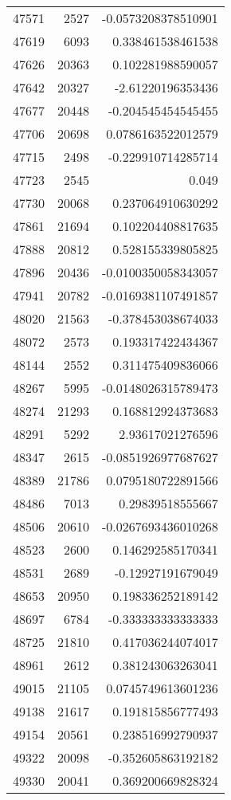 \begin{tabular}{r | r | r}
47571 & 2527 & -0.0573208378510901 \\
47619 & 6093 & 0.338461538461538 \\
47626 & 20363 & 0.102281988590057 \\
47642 & 20327 & -2.61220196353436 \\
47677 & 20448 & -0.204545454545455 \\
47706 & 20698 & 0.0786163522012579 \\
47715 & 2498 & -0.229910714285714 \\
47723 & 2545 & 0.049 \\
47730 & 20068 & 0.237064910630292 \\
47861 & 21694 & 0.102204408817635 \\
47888 & 20812 & 0.528155339805825 \\
47896 & 20436 & -0.0100350058343057 \\
47941 & 20782 & -0.0169381107491857 \\
48020 & 21563 & -0.378453038674033 \\
48072 & 2573 & 0.193317422434367 \\
48144 & 2552 & 0.311475409836066 \\
48267 & 5995 & -0.0148026315789473 \\
48274 & 21293 & 0.168812924373683 \\
48291 & 5292 & 2.93617021276596 \\
48347 & 2615 & -0.0851926977687627 \\
48389 & 21786 & 0.0795180722891566 \\
48486 & 7013 & 0.29839518555667 \\
48506 & 20610 & -0.0267693436010268 \\
48523 & 2600 & 0.146292585170341 \\
48531 & 2689 & -0.12927191679049 \\
48653 & 20950 & 0.198336252189142 \\
48697 & 6784 & -0.333333333333333 \\
48725 & 21810 & 0.417036244074017 \\
48961 & 2612 & 0.381243063263041 \\
49015 & 21105 & 0.0745749613601236 \\
49138 & 21617 & 0.191815856777493 \\
49154 & 20561 & 0.238516992790937 \\
49322 & 20098 & -0.352605863192182 \\
49330 & 20041 & 0.369200669828324 \\

\end{tabular}
